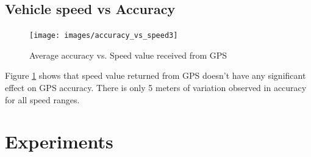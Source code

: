 \documentclass[12pt]{report}
\begin{document}

 
\section{Vehicle speed vs Accuracy}
\begin{figure}[h!]
  \centering
  \texttt{[image: images/accuracy\_vs\_speed3]}
  \caption{Average accuracy vs. Speed value received from GPS}
  \label{accuracy_vs_speed_label}
\end{figure}
Figure \ref{accuracy_vs_speed_label} shows that speed value returned from GPS doesn't
have any significant effect on GPS accuracy. There is only 5 meters of variation
observed in accuracy for all speed ranges.

\chapter{Experiments}
\end{document}
